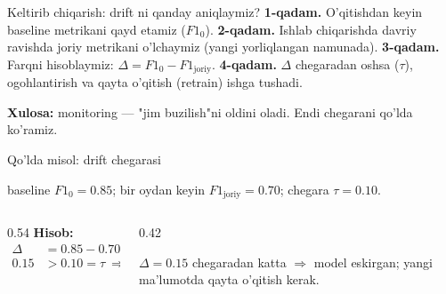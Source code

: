 \documentclass[aspectratio=169,11pt]{beamer}
\begin{document}
\begin{frame}{Keltirib chiqarish: drift ni qanday aniqlaymiz?}
  \textbf{1-qadam.} O'qitishdan keyin baseline metrikani qayd etamiz ($F1_0$).
  \pause
  \textbf{2-qadam.} Ishlab chiqarishda davriy ravishda joriy metrikani o'lchaymiz
  (yangi yorliqlangan namunada).
  \pause
  \textbf{3-qadam.} Farqni hisoblaymiz: $\Delta = F1_0 - F1_{\text{joriy}}$.
  \pause
  \textbf{4-qadam.} $\Delta$ chegaradan oshsa ($\tau$), ogohlantirish va qayta
  o'qitish (retrain) ishga tushadi.
  \begin{tcolorbox}[okbox,top=2pt,bottom=2pt]
    \small \textbf{Xulosa:} monitoring --- "jim buzilish"ni oldini oladi. Endi
    chegarani qo'lda ko'ramiz.
  \end{tcolorbox}
\end{frame}

\begin{frame}{Qo'lda misol: drift chegarasi}
  \begin{tcolorbox}[defbox,title={Berilgan}]
    \small baseline $F1_0 = 0.85$; bir oydan keyin $F1_{\text{joriy}} = 0.70$;
    chegara $\tau = 0.10$.
  \end{tcolorbox}
  \vspace{0.2em}
  \begin{columns}[T]
    \begin{column}{0.54\textwidth}
      \textbf{Hisob:}
      \begin{align*}
        \Delta &= 0.85 - 0.70 = 0.15\\
        0.15 &> 0.10 = \tau \ \Rightarrow\ \textbf{retrain}
      \end{align*}
    \end{column}
    \begin{column}{0.42\textwidth}
      \begin{tcolorbox}[okbox,top=2pt,bottom=2pt]
        \footnotesize
        $\Delta=0.15$ chegaradan katta $\Rightarrow$ model eskirgan; yangi
        ma'lumotda qayta o'qitish kerak.
      \end{tcolorbox}
    \end{column}
  \end{columns}
\end{frame}
\end{document}
